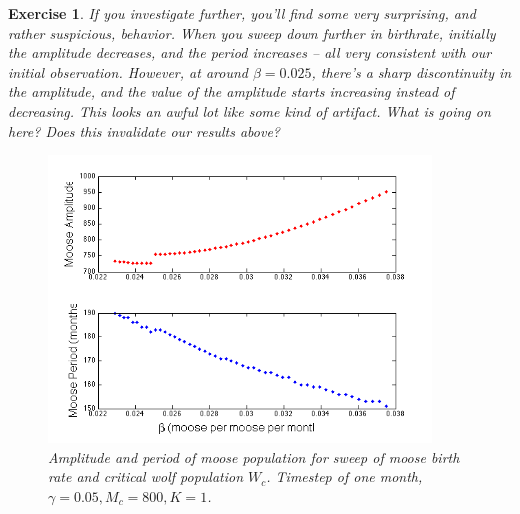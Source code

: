 \documentclass{tufte-handout}
\newtheorem{del}{Exercise}
\begin{document}
\begin{del}

If you investigate further, you'll find some very surprising, and rather suspicious, behavior.  When you sweep down further in birthrate, initially the amplitude decreases, and the period increases -- all very consistent with our initial observation.  However, at around $\beta = 0.025$, there's a sharp discontinuity in the amplitude, and the value of the amplitude starts increasing instead of  decreasing.   This looks an awful lot like some kind of artifact.  What is going on here?  Does this invalidate our results above?

\begin{figure}[h!]
\includegraphics[width=4in]{figs/MooseBCSweep}
\caption{Amplitude and period of moose population for sweep of moose birth rate and critical wolf population $W_c$.  Timestep of one month,  $\gamma = 0.05, M_c = 800, K=1$.}
\end{figure}

\end{del}
 
\end{document}
